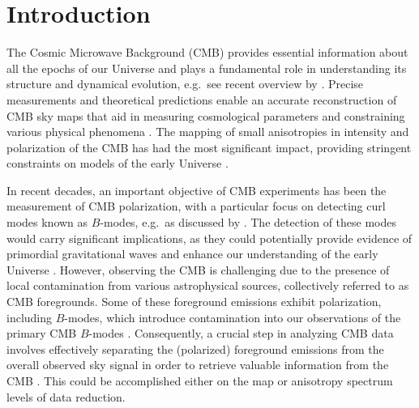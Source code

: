 \documentclass{aa}
\begin{document}
\section{Introduction}
\label{sec:intro}

The Cosmic Microwave Background (CMB) provides essential information about all the epochs of our Universe and plays a fundamental role in understanding its structure and dynamical evolution, e.g.\ see recent overview by \cite{2020A&A...641A...1P}. Precise measurements and theoretical predictions enable an accurate reconstruction of CMB sky maps that aid in measuring cosmological parameters \citep{1994PhRvL..72...13B, 2020A&A...641A...6P} and constraining various physical phenomena \citep{2020A&A...641A...1P}. The mapping of small anisotropies in intensity and polarization of the CMB has had the most significant impact, providing stringent constraints on models of the early Universe \citep{2013ApJS..208...19H, 2020A&A...641A..10P, 2020A&A...641A...9P, 2020A&A...641A...7P}.

In recent decades, an important objective of CMB experiments has been the measurement of CMB polarization, with a particular focus on detecting curl modes known as $B$-modes, e.g.\ as discussed by \cite{2023arXiv230204276W}. The detection of these modes would carry significant implications, as they could potentially provide evidence of primordial gravitational waves and enhance our understanding of the early Universe \citep{1993PhRvL..71..324C}. However, observing the CMB is challenging due to the presence of local contamination from various astrophysical sources, collectively referred to as CMB foregrounds. Some of these foreground emissions exhibit polarization, including $B$-modes, which introduce contamination into our observations of the primary CMB $B$-modes \citep{2020A&A...641A..11P, 2021PhRvL.127o1301A}. Consequently, a crucial step in analyzing CMB data involves effectively separating the (polarized) foreground emissions from the overall observed sky signal in order to retrieve valuable information from the CMB \citep{2008A&A...491..597L, 2020A&A...641A...4P}. This could be accomplished either on the map or anisotropy spectrum levels of data reduction.
\end{document}
